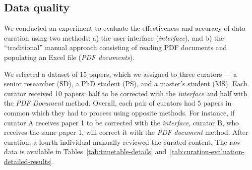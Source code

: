 \subsection{Data quality}
\label{sec:interface-evaluation}
We conducted an experiment to evaluate the effectiveness and accuracy of data curation using two methods: a) the user interface (\textit{interface}), and b) the ``traditional'' manual approach consisting of reading PDF documents and populating an Excel file (\textit{PDF documents}).

We selected a dataset of 15 papers, which we assigned to three curators — a senior researcher (SD), a PhD student (PS), and a master's student (MS). 
Each curator received 10 papers: half to be corrected with the \textit{interface} and half with the \textit{PDF Document} method. 
Overall, each pair of curators had 5 papers in common which they had to process using opposite methods.
For instance, if curator A receives paper 1 to be corrected with the \textit{interface}, curator B, who receives the same paper 1, will correct it with the \textit{PDF document} method.
After curation, a fourth individual manually reviewed the curated content. The raw data is available in Tables~\ref{tab:timetable-details} and~\ref{tab:curation-evaluation-detailed-results}.

